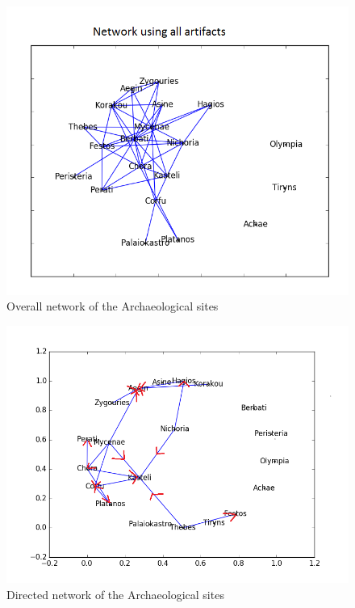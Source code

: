 \begin{figure}
\includegraphics[width=\textwidth]{Overall_Network.png}
\caption{Overall network of the Archaeological sites}
\label{fig:overall}
\end{figure}


\begin{figure}
\includegraphics[width=\textwidth]{Overall_network_direct.png}
\caption{Directed network of the Archaeological sites}
\label{fig:overall}
\end{figure}
